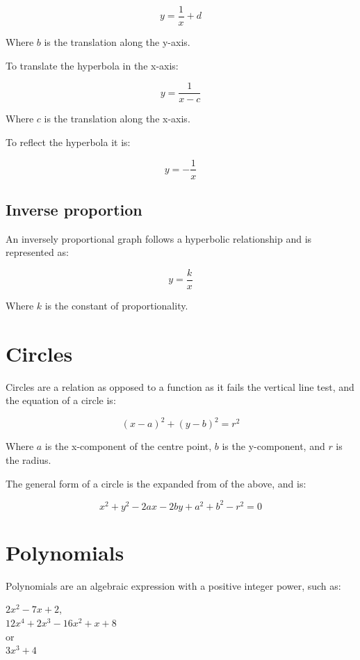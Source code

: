 \documentclass{book}
\begin{document}
\[
	y = \frac{1}{x} + d
\]

Where $b$ is the translation along the y-axis.

To translate the hyperbola in the x-axis:

\[
	y = \frac{1}{x - c}
\]

Where $c$ is the translation along the x-axis.

To reflect the hyperbola it is:

\[
	y = -\frac{1}{x}
\]



\section{Inverse proportion}
An inversely proportional graph follows a hyperbolic relationship and is represented as:

\[
	y = \frac{k}{x}
\]

Where $k$ is the constant of proportionality.




\chapter{Circles}
Circles are a relation as opposed to a function as it fails the vertical line test, and the equation of a circle is:

\[
	(x - a)^2 + (y - b)^2 = r^2
\]

Where $a$ is the x-component of the centre point,  $b$ is the y-component, and $r$ is the radius.

The general form of a circle is the expanded from of the above, and is:

\[
	x^2 + y^2 - 2ax - 2by + a^2 + b^2 -r^2 = 0
\]




\chapter{Polynomials}
Polynomials are an algebraic expression with a positive integer power, such as:

\begin{center}
	$2x^2 - 7x + 2$,\\
	$12x^4 + 2x^3 - 16x^2 + x + 8$\\
	or\\
	$3x^3 + 4$
\end{center}
\end{document}

